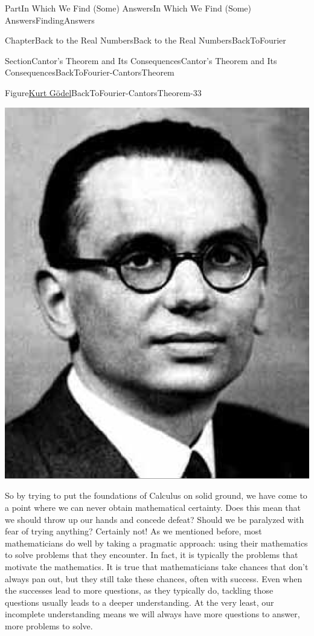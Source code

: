 \documentclass[oneside,10pt,]{book}
\numberwithin{equation}{part}
\begin{document}
\begin{partptx}{Part}{In Which We Find (Some) Answers}{}{In Which We Find (Some) Answers}{}{}{FindingAnswers}
\begin{chapterptx}{Chapter}{Back to the Real Numbers}{}{Back to the Real Numbers}{}{}{BackToFourier}
\begin{sectionptx}{Section}{Cantor's Theorem and Its Consequences}{}{Cantor's Theorem and Its Consequences}{}{}{BackToFourier-CantorsTheorem}
\begin{figureptx}{Figure}{\href{https://mathshistory.st-andrews.ac.uk/Biographies/Godel/}{Kurt Gödel}\protect\footnotemark{}}{BackToFourier-CantorsTheorem-33}{}
\begin{image}{0.325}{0.35}{0.325}{}
\includegraphics[width=\linewidth]{external/images/Godel.png}
\end{image}%
\tcblower
\end{figureptx}%
%
So by trying to put the foundations of Calculus on solid ground, we have come to a point where we can never obtain mathematical certainty.  Does this mean that we should throw up our hands and concede defeat?  Should we be paralyzed with fear of trying anything?  Certainly not!  As we mentioned before, most mathematicians do well by taking a pragmatic approach: using their mathematics to solve problems that they encounter.  In fact, it is typically the problems that motivate the mathematics.  It is true that mathematicians take chances that don't always pan out, but they still take these chances, often with success.  Even when the successes lead to more questions, as they typically do, tackling those questions usually leads to a deeper understanding.  At the very least, our incomplete understanding means we will always have more questions to answer, more problems to solve.%

\end{sectionptx}
\end{chapterptx}
\end{partptx}
\end{document}
